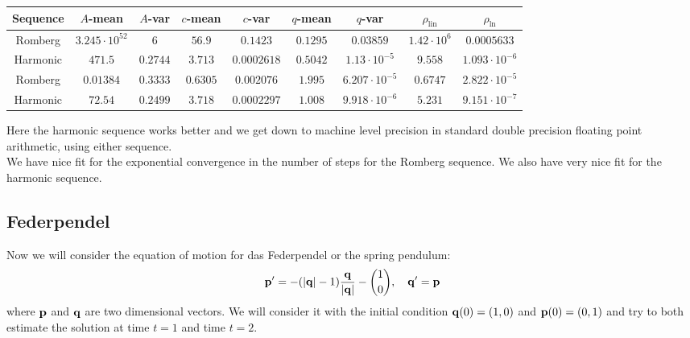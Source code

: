 \begin{table}[H]
    \centering
    \small
    \begin{tabular}{c||c|c|c|c|c|c|c|c}
Sequence & \(A\)-mean & \(A\)-var & \(c\)-mean & \(c\)-var & \(q\)-mean & \(q\)-var & \(\rho_{\operatorname{lin}}\) & \(\rho_{\ln}\)\\\hline
\rowcolor{red}
Romberg & \(3.245\cdot 10^{52}\) & \(6\) & \(56.9\) & \(0.1423\) & \(0.1295\) & \(0.03859\) & \(1.42\cdot 10^6\) & \(0.0005633\) \\
\rowcolor{green}
Harmonic & \(471.5\) & \(0.2744\) & \(3.713\) & \(0.0002618\) & \(0.5042\) & \(1.13\cdot 10^{-5}\) & \(9.558\) & \(1.093\cdot 10^{-6}\) \\
\rowcolor{green}
Romberg & \(0.01384\) & \(0.3333\) & \(0.6305\) & \(0.002076\) & \(1.995\) & \(6.207\cdot 10^{-5}\) & \(0.6747\) & \(2.822\cdot 10^{-5}\) \\
\rowcolor{green}
Harmonic & \(72.54\) & \(0.2499\) & \(3.718\) & \(0.0002297\) & \(1.008\) & \(9.918\cdot 10^{-6}\) & \(5.231\) & \(9.151\cdot 10^{-7}\) \\
    \end{tabular}
    \label{tab:my_label}
\end{table}

Here the harmonic sequence works better and we get down to machine level precision in standard double precision floating point arithmetic, using either sequence.\\

We have nice fit for the exponential convergence in the number of steps for the Romberg sequence. We also have very nice fit for the harmonic sequence.

\subsection{Federpendel}

Now we will consider the equation of motion for das Federpendel or the spring pendulum:
\[
\mathbf{p}' = -(|\mathbf{q}| - 1)\frac{\mathbf{q}}{|\mathbf{q}|} - {1\choose 0}, \quad \mathbf{q}' = \mathbf{p}
\]
where \(\mathbf{p}\) and \(\mathbf{q}\) are two dimensional vectors. We will consider it with the initial condition \(\mathbf{q}(0) = (1,0)\) and \(\mathbf{p}(0) = (0,1)\) and try to both estimate the solution at time \(t = 1\) and time \(t = 2\). 

